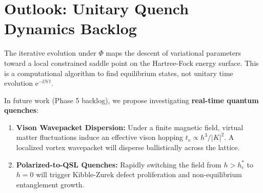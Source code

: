 \section{Outlook: Unitary Quench Dynamics Backlog}
\label{sec:phase4_backlog}

The iterative evolution under $\Phi$ maps the descent of variational parameters toward a local constrained saddle point on the Hartree-Fock energy surface. This is a computational algorithm to find equilibrium states, not unitary time evolution $\mathrm{e}^{-\ii \mathcal{H} t}$.

In future work (Phase 5 backlog), we propose investigating \textbf{real-time quantum quenches}:
\begin{enumerate}
    \item \textbf{Vison Wavepacket Dispersion:} Under a finite magnetic field, virtual matter fluctuations induce an effective vison hopping $t_v \propto h^3 / |K|^2$. A localized vortex wavepacket will disperse ballistically across the lattice.
    \item \textbf{Polarized-to-QSL Quenches:} Rapidly switching the field from $h > h_c^*$ to $h = 0$ will trigger Kibble-Zurek defect proliferation and non-equilibrium entanglement growth.
\end{enumerate}

